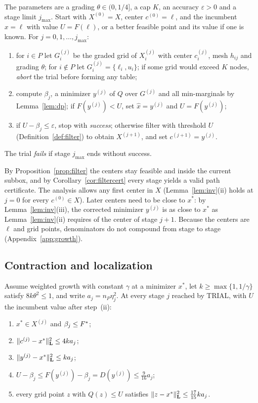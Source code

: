 \begin{algorithm}\label{alg:trial}
The parameters are a grading $\theta\in(0,1/4]$, a cap $K$, an accuracy
$\varepsilon>0$ and a stage limit $j_{\max}$. Start with $X^{(0)}=X$, center
$c^{(0)}=\ell$, and the incumbent $\hat x=\ell$ with value $U=F(\ell)$, or a
better feasible point and its value if one is known. For
$j=0,1,\dots,j_{\max}$:
\begin{enumerate}[label=(\roman*)]
\item for $i\in P$ let $G_i^{(j)}$ be the graded grid of $X_i^{(j)}$ with
center $c_i^{(j)}$, mesh $h_{ij}$ and grading $\theta$; for $i\notin P$ let
$G_i^{(j)}=\{\ell_i,u_i\}$; if some grid would exceed $K$ nodes,
\emph{abort} the trial before forming any table;
\item compute $\beta_j$, a minimizer $y^{(j)}$ of $Q$ over $G^{(j)}$ and all
min-marginals by Lemma~\ref{lem:dp}; if $F(y^{(j)})<U$, set
$\hat x=y^{(j)}$ and $U=F(y^{(j)})$;
\item if $U-\beta_j\le\varepsilon$, stop with \emph{success}; otherwise
filter with threshold $U$ (Definition~\ref{def:filter}) to obtain
$X^{(j+1)}$, and set $c^{(j+1)}=y^{(j)}$.
\end{enumerate}
The trial \emph{fails} if stage $j_{\max}$ ends without success.
\end{algorithm}

By Proposition~\ref{prop:filter} the centers stay feasible and inside the
current subbox, and by Corollary~\ref{cor:filtercert} every stage yields a
valid path certificate. The analysis allows any first center in $X$
(Lemma~\ref{lem:inv}(ii) holds at $j=0$ for every $c^{(0)}\in X$). Later
centers need to be close to $x^*$: by Lemma~\ref{lem:inv}(iii), the corrected
minimizer $y^{(j)}$ is as close to $x^*$ as Lemma~\ref{lem:inv}(ii) requires
of the center of stage $j+1$. Because the centers are $\ell$ and grid points,
denominators do not compound from stage to stage
(Appendix~\ref{app:growth}).

\subsection{Contraction and localization}

\begin{lemma}\label{lem:inv}
Assume weighted growth with constant $\gamma$ at a minimizer $x^*$, let
$k\ge\max\{1,1/\gamma\}$ satisfy $8k\theta^2\le1$, and write
$a_j=n_P\eta_j^2$. At every stage $j$ reached by TRIAL, with $U$ the
incumbent value after step~(ii):
\begin{enumerate}[label=(\roman*)]
\item $x^*\in X^{(j)}$ and $\beta_j\le F^{*}$;
\item $\lVert c^{(j)}-x^*\rVert_{\mathbf L}^2\le4ka_j$;
\item $\lVert y^{(j)}-x^*\rVert_{\mathbf L}^2\le ka_j$;
\item $U-\beta_j\le F(y^{(j)})-\beta_j=D(y^{(j)})\le\frac9{16}a_j$;
\item every grid point $z$ with $Q(z)\le U$ satisfies
$\lVert z-x^*\rVert_{\mathbf L}^2\le\frac{17}{15}ka_j$.
\end{enumerate}
\end{lemma}

